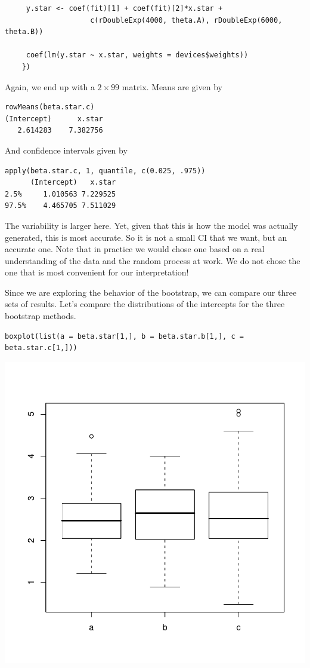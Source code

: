 \documentclass{article}
\begin{document}
\begin{description}
\begin{enumerate}
\begin{verbatim}
     y.star <- coef(fit)[1] + coef(fit)[2]*x.star + 
                    c(rDoubleExp(4000, theta.A), rDoubleExp(6000, theta.B))

     coef(lm(y.star ~ x.star, weights = devices$weights))
    })
\end{verbatim}
Again, we end up with a $2 \times 99$ matrix.
Means are given by
\begin{verbatim}
rowMeans(beta.star.c)
(Intercept)      x.star 
   2.614283    7.382756 
\end{verbatim}
And confidence intervals given by
\begin{verbatim}
apply(beta.star.c, 1, quantile, c(0.025, .975))
      (Intercept)   x.star
2.5%     1.010563 7.229525
97.5%    4.465705 7.511029
\end{verbatim}

The variability is larger here. Yet, given that this is how the model
was actually generated, this is most accurate.  So it is not a small
CI that we want, but an accurate one.  Note that in practice we would
chose one based on a real understanding of the data and the random
process at work. We do not chose the one that is most convenient
for our interpretation!
\end{enumerate}

Since we are exploring the behavior of the bootstrap,
we can compare our three sets of results.
Let's compare the distributions of the intercepts 
for the three bootstrap methods.
\begin{verbatim}
boxplot(list(a = beta.star[1,], b = beta.star.b[1,], c = beta.star.c[1,]))
\end{verbatim}
\includegraphics{images/bootstrapIntercepts.pdf}


\end{description}
\end{document}
